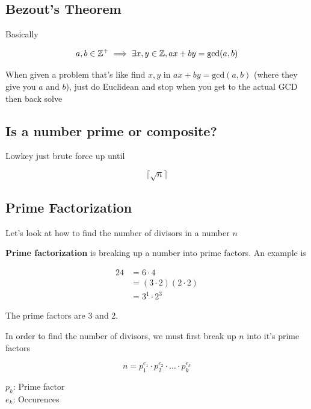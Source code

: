 \documentclass[../../Main.tex]{subfiles}
\begin{document}
\subsection{Bezout's Theorem}

\begin{theorem}

    Basically

    $$a, b \in \mathbb{Z}^+ \implies \exists x, y \in \mathbb{Z}, ax + by = \text{gcd}(a, b)$$
\end{theorem}

When given a problem that's like find $x, y$ in $ax + by = \text{gcd}(a,b)$ (where they give you $a$ and $b$), just
do Euclidean and stop when you get to the actual GCD then back solve

\subsection{Is a number prime or composite?}

Lowkey just brute force up until 

$$\lceil \sqrt{n} \rceil$$

\subsection{Prime Factorization}

Let's look at how to find the number of divisors in a number $n$

\begin{definition}
    \textbf{Prime factorization} is breaking up a number into prime factors. An example is

    \begin{align*}
        24 &= 6 \cdot 4 \\
        &= (3 \cdot 2)(2 \cdot 2) \\
        &= 3^1 \cdot 2^3
    \end{align*}

    The prime factors are 3 and 2.
\end{definition}

In order to find the number of divisors, we must first break up $n$ into it's prime factors

$$n = p_1^{e_1} \cdot p_2^{e_2} \cdot \ldots \cdot p_k^{e_k}$$

\begin{center}
    $p_k$: Prime factor \\
    $e_k$: Occurences
\end{center}
\end{document}
